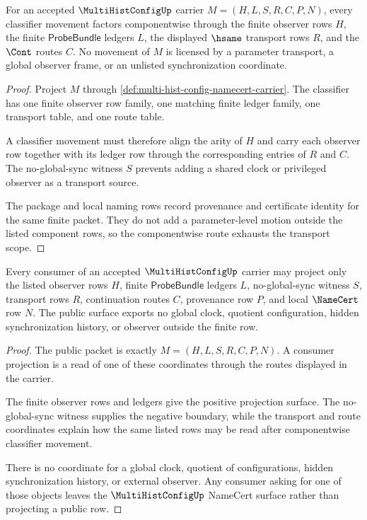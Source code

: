 \begin{theorem}
\label{thm:multihist-config-component-transport-scope}
For an accepted $\MultiHistConfigUp$ carrier $M=(H,L,S,R,C,P,N)$, every classifier movement factors componentwise through the finite observer rows $H$, the finite $\mathsf{ProbeBundle}$ ledgers $L$, the displayed $\hsame$ transport rows $R$, and the $\Cont$ routes $C$. No movement of $M$ is licensed by a parameter transport, a global observer frame, or an unlisted synchronization coordinate.
\end{theorem}
\begin{proof}
Project $M$ through \autoref{def:multi-hist-config-namecert-carrier}. The classifier has one finite observer row family, one matching finite ledger family, one transport table, and one route table.

A classifier movement must therefore align the arity of $H$ and carry each observer row together with its ledger row through the corresponding entries of $R$ and $C$. The no-global-sync witness $S$ prevents adding a shared clock or privileged observer as a transport source.

The package and local naming rows record provenance and certificate identity for the same finite packet. They do not add a parameter-level motion outside the listed component rows, so the componentwise route exhausts the transport scope.
\end{proof}

\begin{theorem}
\label{thm:multihist-config-consumer-projection-boundary}
Every consumer of an accepted $\MultiHistConfigUp$ carrier may project only the listed observer rows $H$, finite $\mathsf{ProbeBundle}$ ledgers $L$, no-global-sync witness $S$, transport rows $R$, continuation routes $C$, provenance row $P$, and local $\NameCert$ row $N$. The public surface exports no global clock, quotient configuration, hidden synchronization history, or observer outside the finite row.
\end{theorem}
\begin{proof}
The public packet is exactly $M=(H,L,S,R,C,P,N)$. A consumer projection is a read of one of these coordinates through the routes displayed in the carrier.

The finite observer rows and ledgers give the positive projection surface. The no-global-sync witness supplies the negative boundary, while the transport and route coordinates explain how the same listed rows may be read after componentwise classifier movement.

There is no coordinate for a global clock, quotient of configurations, hidden synchronization history, or external observer. Any consumer asking for one of those objects leaves the $\MultiHistConfigUp$ NameCert surface rather than projecting a public row.
\end{proof}

